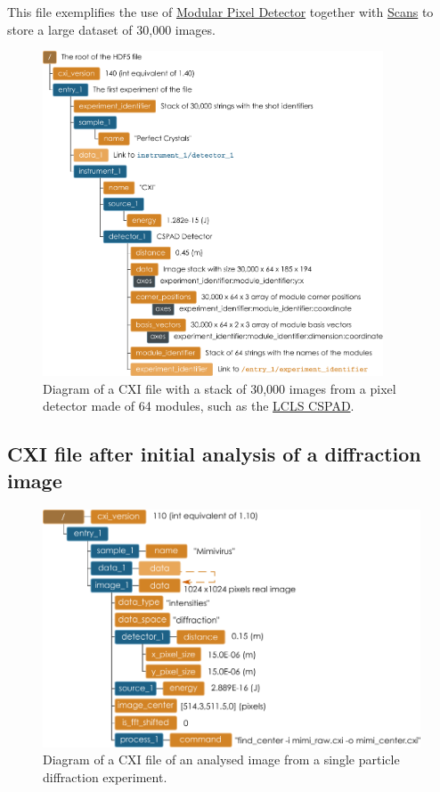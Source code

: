 \documentclass[usletter,11pt]{article}
\begin{document}
This file exemplifies the use of \hyperref[subsec:modularDetectors]{Modular
  Pixel Detector} together with \hyperref[sec:scans]{Scans} to store a large
dataset of 30,000 images.
\begin{figure}[h!]
\centering
\includegraphics[width=0.9\textwidth]{stack_modular_detector_cxi.pdf}
\caption{Diagram of a CXI file with a stack of 30,000 images from a pixel detector made of 64
  modules, such as the \hyperref[fig:cspad]{LCLS CSPAD}.}
\label{fig:stack_modular_detector_cxi}
\end{figure}
\clearpage

\subsection{CXI file after initial analysis of a diffraction image}

\begin{figure}[h!]
\centering
\includegraphics[width=\textwidth]{analysed_image.pdf}
\caption{Diagram of a CXI file of an analysed image from a single
particle diffraction experiment.}
\label{fig:analysed_image}
\end{figure}
\end{document}

